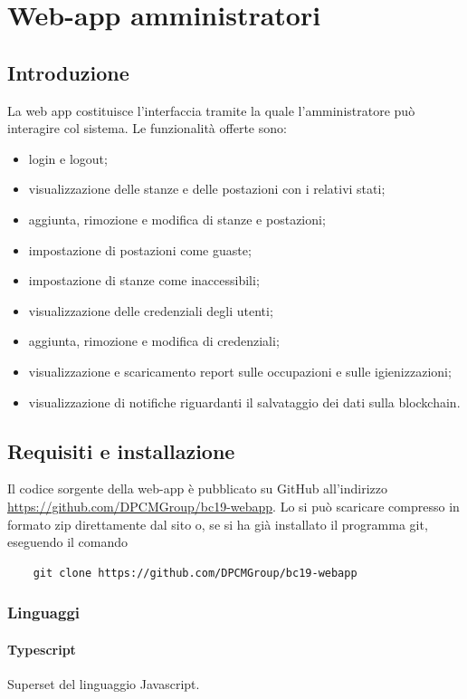 \section{Web-app amministratori}
\subsection{Introduzione}
La web app costituisce l'interfaccia tramite la quale l'amministratore può interagire col sistema.
Le funzionalità offerte sono:
\begin{itemize}
	\item login e logout;
	\item visualizzazione delle stanze e delle postazioni con i relativi stati;
	\item aggiunta, rimozione e modifica di stanze e postazioni;
	\item impostazione di postazioni come guaste;
	\item impostazione di stanze come inaccessibili;
	\item visualizzazione delle credenziali degli utenti;
	\item aggiunta, rimozione e modifica di credenziali;
	\item visualizzazione e scaricamento report sulle occupazioni e sulle igienizzazioni;
	\item visualizzazione di notifiche riguardanti il salvataggio dei dati sulla blockchain.
\end{itemize}

\subsection{Requisiti e installazione}
Il codice sorgente della web-app è pubblicato su GitHub all'indirizzo \url{https://github.com/DPCMGroup/bc19-webapp}.
Lo si può scaricare compresso in formato zip direttamente dal sito o, se si ha già installato il programma git, eseguendo il comando
\begin{verbatim}
	git clone https://github.com/DPCMGroup/bc19-webapp
\end{verbatim}

\subsubsection{Linguaggi}
\paragraph{Typescript}
Superset del linguaggio Javascript.

